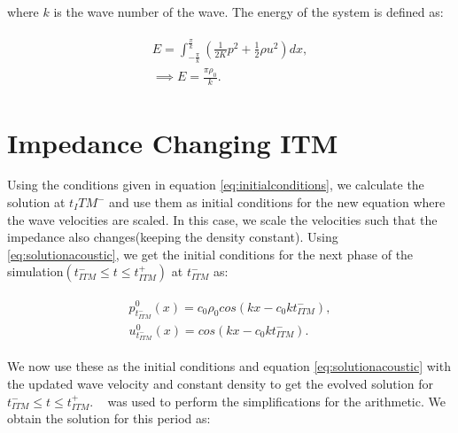 where $k$ is the wave number of the wave. The energy of the system is defined as:

\begin{align}
    \begin{split}
     E = \int_{-\frac{\pi}{k}}^{\frac{\pi}{k}} \left(\frac{1}{2K}p^2 + \frac{1}{2}\rho u^2\right) dx , \\
     \implies E = \frac{\pi\rho_0}{k} .
    \end{split}
\end{align}

\section{Impedance Changing \ac{ITM}}
Using the conditions given in equation \ref{eq:initialconditions}, we calculate the solution at $t_ITM^-$ and use them as initial conditions for the new equation where the wave velocities are scaled.
In this case, we scale the velocities such that the impedance also changes(keeping the density constant). Using \ref{eq:solutionacoustic}, we get the initial conditions for the next phase of the simulation$\left(t_{ITM}^- \leq t \leq t_{ITM}^+ \right)$ at $t_{ITM}^-$ as:

\begin{align}
    \begin{split}
        p^0_{t_{ITM}^-}\left(x\right) = c_0 \rho_0 cos\left(kx - c_0kt_{ITM}^-\right), \\
        u^0_{t_{ITM}^-}\left(x\right) = cos\left(kx - c_0kt_{ITM}^-\right) .
    \end{split}
\end{align}

We now use these as the initial conditions and equation \ref{eq:solutionacoustic} with the updated wave velocity and constant density to get the evolved solution for $t_{ITM}^- \leq t \leq t_{ITM}^+ $. ~\parencite{sagemath} was used to perform the simplifications for the arithmetic. We obtain the solution for this period as:
